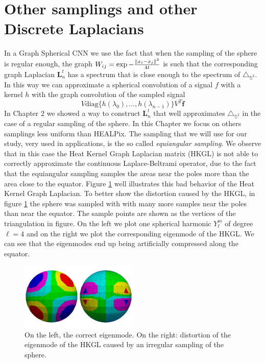 

\section{Other samplings and other Discrete Laplacians}

In a Graph Spherical CNN we use the fact that when the sampling of the sphere is regular enough, the graph $W_{i j} = \exp {-\frac{\left\lVert x_i-x_j\right\rVert^2}{4t}}$ is such that the corresponding graph Laplacian $\mathbf L_n^t$ has a spectrum that is close enough to the spectrum of $\triangle_{\mathbb S^2}$. In this way we can approximate a spherical convolution of a signal $f$ with a kernel $h$ with the graph convolution of the sampled signal 
$$
V\text{diag}\{h(\lambda_0), ..., h(\lambda_{n-1})\}V^T\mathbf f
$$
In Chapter 2 we showed a way to construct $\mathbf L_n^t$ that well approximates $\triangle_{\mathbb S^2}$ in the case of a regular sampling of the sphere. In this Chapter we focus on others samplings less uniform than HEALPix. The sampling that we will use for our study, very used in applications, is the so called \textit{equiangular sampling}. We observe that in this case the Heat Kernel Graph Laplacian matrix (HKGL) is not able to correctly approximate the continuous Laplace-Beltrami operator, due to the fact that the equiangular sampling samples the areas near the poles more than the area close to the equator. Figure \ref{fig:equiangular distortion} well illustrates this bad behavior of the Heat Kernel Graph Laplacian. To better show the distortion caused by the HKGL, in figure \ref{fig:equiangular distortion} the sphere was sampled with with many more samples near the poles than near the equator. The sample points are shown as the vertices of the triangulation in figure. On the left we plot one spherical harmonic $Y_\ell^m$ of degree $\ell=4$ and on the right we plot the corresponding eigenmode of the HKGL. We can see that the eigenmodes end up being artificially compressed along the equator.
\begin{figure}
	\begin{center}
		\includegraphics[width=0.5\textwidth]{../codes/04.imbalanced/img/confront_mixed.png}
	\end{center}
	\caption{\label{fig:equiangular distortion}On the left, the correct eigenmode. On the right: distortion of the eigenmode of the HKGL caused by an irregular sampling of the sphere.}
\end{figure}
